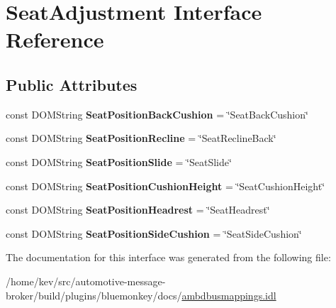 \hypertarget{interfaceSeatAdjustment}{\section{Seat\+Adjustment Interface Reference}
\label{interfaceSeatAdjustment}
}
\subsection*{Public Attributes}
\begin{DoxyCompactItemize}
\item 
\hypertarget{interfaceSeatAdjustment_a334764c18dc5d34fc8ca2dd9580b6990}{const D\+O\+M\+String {\bfseries Seat\+Position\+Back\+Cushion} = \char`\"{}Seat\+Back\+Cushion\char`\"{}}\label{interfaceSeatAdjustment_a334764c18dc5d34fc8ca2dd9580b6990}

\item 
\hypertarget{interfaceSeatAdjustment_ad0275f9cb3dd564d491084932494b58b}{const D\+O\+M\+String {\bfseries Seat\+Position\+Recline} = \char`\"{}Seat\+Recline\+Back\char`\"{}}\label{interfaceSeatAdjustment_ad0275f9cb3dd564d491084932494b58b}

\item 
\hypertarget{interfaceSeatAdjustment_a19a1cdb6147bf51b16ee4c45ea16a399}{const D\+O\+M\+String {\bfseries Seat\+Position\+Slide} = \char`\"{}Seat\+Slide\char`\"{}}\label{interfaceSeatAdjustment_a19a1cdb6147bf51b16ee4c45ea16a399}

\item 
\hypertarget{interfaceSeatAdjustment_ad4fa353e4948b849011a61324d2d257d}{const D\+O\+M\+String {\bfseries Seat\+Position\+Cushion\+Height} = \char`\"{}Seat\+Cushion\+Height\char`\"{}}\label{interfaceSeatAdjustment_ad4fa353e4948b849011a61324d2d257d}

\item 
\hypertarget{interfaceSeatAdjustment_adecde776f5f2413bfc213d14d2a492df}{const D\+O\+M\+String {\bfseries Seat\+Position\+Headrest} = \char`\"{}Seat\+Headrest\char`\"{}}\label{interfaceSeatAdjustment_adecde776f5f2413bfc213d14d2a492df}

\item 
\hypertarget{interfaceSeatAdjustment_a97645db443fc452ed3249b164c0b5df4}{const D\+O\+M\+String {\bfseries Seat\+Position\+Side\+Cushion} = \char`\"{}Seat\+Side\+Cushion\char`\"{}}\label{interfaceSeatAdjustment_a97645db443fc452ed3249b164c0b5df4}

\end{DoxyCompactItemize}


The documentation for this interface was generated from the following file\+:\begin{DoxyCompactItemize}
\item 
/home/kev/src/automotive-\/message-\/broker/build/plugins/bluemonkey/docs/\hyperlink{ambdbusmappings_8idl}{ambdbusmappings.\+idl}\end{DoxyCompactItemize}
